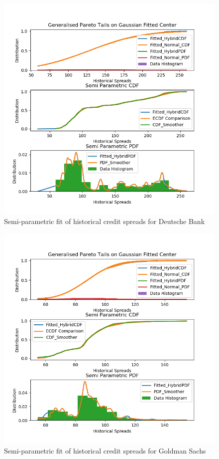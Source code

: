 \documentclass{report}
\theoremstyle{plain}
\theoremstyle{definition}
\begin{document}
\begin{figure}[H]
	\begin{center}
		\includegraphics[width=15cm]{SemiParametricFit_DB_CDS_EUR_SR_5Y_D14.png}
		\caption{Semi-parametric fit of historical credit spreads for Deutsche Bank} 
		\label{SemiParametricFit_DB_CDS_EUR_SR_5Y_D14}
	\end{center}
\end{figure}

\begin{figure}[H]
	\begin{center}
		\includegraphics[width=15cm]{SemiParametricFit_GS_CDS_USD_SR_5Y_D14.png}
		\caption{Semi-parametric fit of historical credit spreads for Goldman Sachs} 
		\label{SemiParametricFit_GS_CDS_USD_SR_5Y_D14}
	\end{center}
\end{figure}
\end{document}
